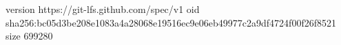version https://git-lfs.github.com/spec/v1
oid sha256:bc05d3be208e1083a4a28068e19516ec9e06eb49977c2a9df4724f00f26f8521
size 699280
